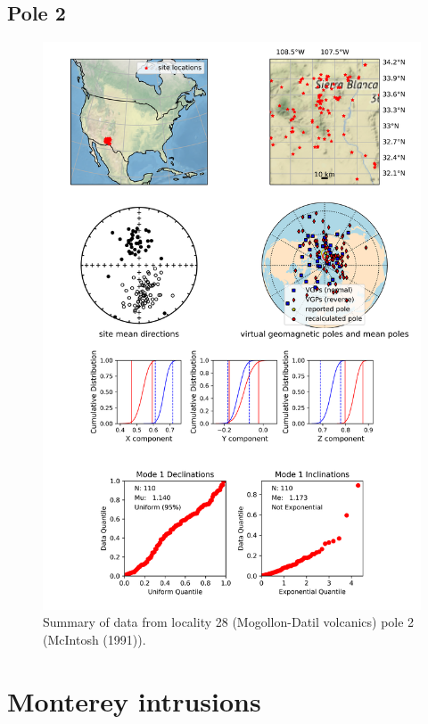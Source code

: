 \documentclass{article}
\begin{document}
\subsection{Pole 2}


\begin{figure}[H]
\centering
\includegraphics[width=5 in]{./28/2/pole_summary.png}
\caption{Summary of data from locality 28 (Mogollon-Datil volcanics) pole 2 (McIntosh (1991)).}
\end{figure}

\section{Monterey intrusions}
\end{document}
